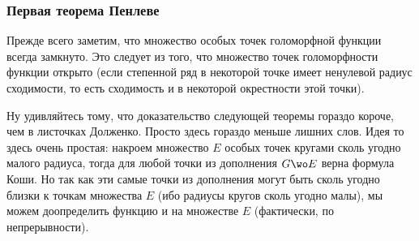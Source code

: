 \documentclass[a4paper]{article}
\begin{document}
\subsubsection{Первая теорема Пенлеве}

Прежде всего заметим, что множество особых точек голоморфной функции всегда  замкнуто.
Это следует из того, что множество точек голоморфности функции открыто (если степенной ряд в некоторой точке
имеет ненулевой радиус сходимости, то есть сходимость и в некоторой окрестности этой точки).

\begin{petit}
Ну удивляйтесь тому, что доказательство следующей теоремы гораздо короче, чем в листочках Долженко.
Просто здесь гораздо меньше лишних слов. Идея то здесь очень простая: накроем множество $E$ особых точек
кругами сколь угодно малого радиуса, тогда для любой точки из дополнения $G\wo E$ верна формула Коши. Но так как
эти самые точки из дополнения могут быть сколь угодно близки к точкам множества $E$ (ибо радиусы кругов сколь угодно малы),
мы можем доопределить функцию и на множестве $E$ (фактически, по непрерывности).
\end{petit}
\end{document}
